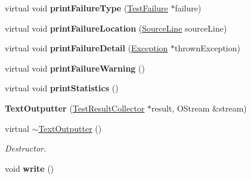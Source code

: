 \begin{DoxyCompactItemize}
\item 
\hypertarget{class_text_outputter_aee3226d89c6eed004ba3afd92355dd97}{virtual void {\bfseries print\+Failure\+Type} (\hyperlink{class_test_failure}{Test\+Failure} $\ast$failure)}\label{class_text_outputter_aee3226d89c6eed004ba3afd92355dd97}

\item 
\hypertarget{class_text_outputter_a313c6845b2ca97872a7d9fc4e4af7efe}{virtual void {\bfseries print\+Failure\+Location} (\hyperlink{class_source_line}{Source\+Line} source\+Line)}\label{class_text_outputter_a313c6845b2ca97872a7d9fc4e4af7efe}

\item 
\hypertarget{class_text_outputter_aa5620a31d1e87c44813fe3ad656091b6}{virtual void {\bfseries print\+Failure\+Detail} (\hyperlink{class_exception}{Exception} $\ast$thrown\+Exception)}\label{class_text_outputter_aa5620a31d1e87c44813fe3ad656091b6}

\item 
\hypertarget{class_text_outputter_ac2c9fd812f2f5ccb2efec767d48d02aa}{virtual void {\bfseries print\+Failure\+Warning} ()}\label{class_text_outputter_ac2c9fd812f2f5ccb2efec767d48d02aa}

\item 
\hypertarget{class_text_outputter_af78df99fecc1966bf41e9b22069a4aff}{virtual void {\bfseries print\+Statistics} ()}\label{class_text_outputter_af78df99fecc1966bf41e9b22069a4aff}

\item 
\hypertarget{class_text_outputter_aa513788ccc271901964847902fe3fe8e}{{\bfseries Text\+Outputter} (\hyperlink{class_test_result_collector}{Test\+Result\+Collector} $\ast$result, O\+Stream \&stream)}\label{class_text_outputter_aa513788ccc271901964847902fe3fe8e}

\item 
\hypertarget{class_text_outputter_a4198a0eaa07f3ff43fcbcab74d080b6b}{virtual \hyperlink{class_text_outputter_a4198a0eaa07f3ff43fcbcab74d080b6b}{$\sim$\+Text\+Outputter} ()}\label{class_text_outputter_a4198a0eaa07f3ff43fcbcab74d080b6b}

\begin{DoxyCompactList}\small\item\em Destructor. \end{DoxyCompactList}\item 
\hypertarget{class_text_outputter_a6b52425e9d17a04f04fc42a88b564176}{void {\bfseries write} ()}\label{class_text_outputter_a6b52425e9d17a04f04fc42a88b564176}


\end{DoxyCompactItemize}

